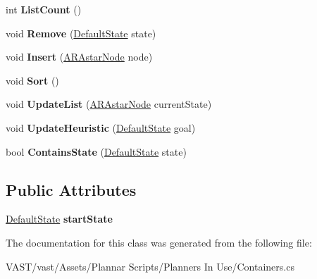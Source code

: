 \begin{DoxyCompactItemize}
\item 
\hypertarget{class_open_container_abd9ac817ab140603feee84f8995a27a0}{int {\bfseries List\-Count} ()}\label{class_open_container_abd9ac817ab140603feee84f8995a27a0}

\item 
\hypertarget{class_open_container_a5f585b8681b2e0425119f7a59caf362e}{void {\bfseries Remove} (\hyperlink{class_default_state}{Default\-State} state)}\label{class_open_container_a5f585b8681b2e0425119f7a59caf362e}

\item 
\hypertarget{class_open_container_a3cd8532faf8cf40de6b89fb57c685df8}{void {\bfseries Insert} (\hyperlink{class_a_r_astar_node}{A\-R\-Astar\-Node} node)}\label{class_open_container_a3cd8532faf8cf40de6b89fb57c685df8}

\item 
\hypertarget{class_open_container_a09946014eab624c239cce93a85988071}{void {\bfseries Sort} ()}\label{class_open_container_a09946014eab624c239cce93a85988071}

\item 
\hypertarget{class_open_container_ac3edc61c5f1a9b66c3f7c7acd0640e0d}{void {\bfseries Update\-List} (\hyperlink{class_a_r_astar_node}{A\-R\-Astar\-Node} current\-State)}\label{class_open_container_ac3edc61c5f1a9b66c3f7c7acd0640e0d}

\item 
\hypertarget{class_open_container_a12984d3becd0ff24eca4c4371881a71b}{void {\bfseries Update\-Heuristic} (\hyperlink{class_default_state}{Default\-State} goal)}\label{class_open_container_a12984d3becd0ff24eca4c4371881a71b}

\item 
\hypertarget{class_open_container_ae5ef558400b142f682464bdab1174e43}{bool {\bfseries Contains\-State} (\hyperlink{class_default_state}{Default\-State} state)}\label{class_open_container_ae5ef558400b142f682464bdab1174e43}

\end{DoxyCompactItemize}
\subsection*{Public Attributes}
\begin{DoxyCompactItemize}
\item 
\hypertarget{class_open_container_a656a492f930544d2691fa1780cc14e26}{\hyperlink{class_default_state}{Default\-State} {\bfseries start\-State}}\label{class_open_container_a656a492f930544d2691fa1780cc14e26}

\end{DoxyCompactItemize}


The documentation for this class was generated from the following file\-:\begin{DoxyCompactItemize}
\item 
V\-A\-S\-T/vast/\-Assets/\-Plannar Scripts/\-Planners In Use/Containers.\-cs\end{DoxyCompactItemize}
